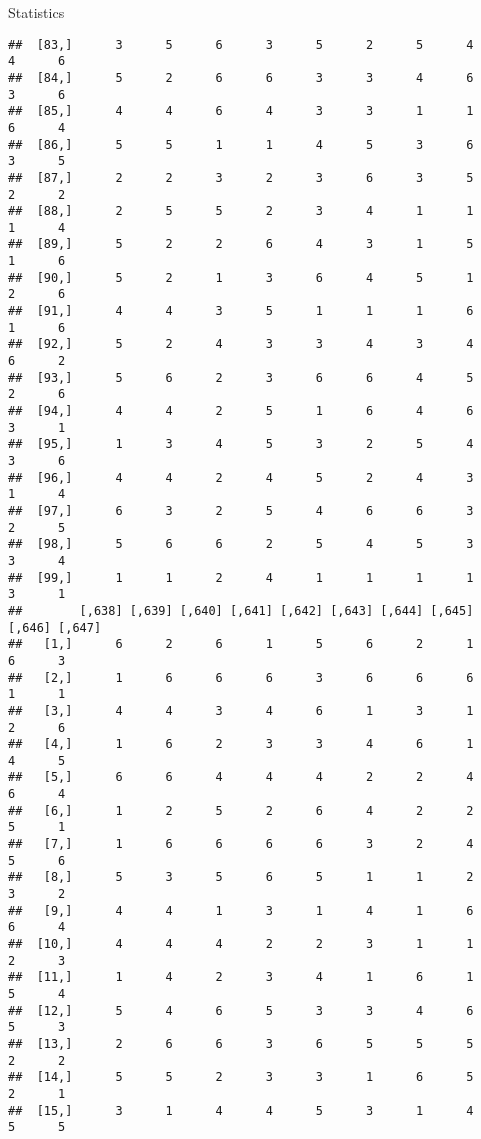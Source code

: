\documentclass[
  ignorenonframetext,
]{beamer}
\begin{document}
\begin{frame}[fragile]{Statistics}
\begin{verbatim}
##  [83,]      3      5      6      3      5      2      5      4      4      6
##  [84,]      5      2      6      6      3      3      4      6      3      6
##  [85,]      4      4      6      4      3      3      1      1      6      4
##  [86,]      5      5      1      1      4      5      3      6      3      5
##  [87,]      2      2      3      2      3      6      3      5      2      2
##  [88,]      2      5      5      2      3      4      1      1      1      4
##  [89,]      5      2      2      6      4      3      1      5      1      6
##  [90,]      5      2      1      3      6      4      5      1      2      6
##  [91,]      4      4      3      5      1      1      1      6      1      6
##  [92,]      5      2      4      3      3      4      3      4      6      2
##  [93,]      5      6      2      3      6      6      4      5      2      6
##  [94,]      4      4      2      5      1      6      4      6      3      1
##  [95,]      1      3      4      5      3      2      5      4      3      6
##  [96,]      4      4      2      4      5      2      4      3      1      4
##  [97,]      6      3      2      5      4      6      6      3      2      5
##  [98,]      5      6      6      2      5      4      5      3      3      4
##  [99,]      1      1      2      4      1      1      1      1      3      1
##        [,638] [,639] [,640] [,641] [,642] [,643] [,644] [,645] [,646] [,647]
##   [1,]      6      2      6      1      5      6      2      1      6      3
##   [2,]      1      6      6      6      3      6      6      6      1      1
##   [3,]      4      4      3      4      6      1      3      1      2      6
##   [4,]      1      6      2      3      3      4      6      1      4      5
##   [5,]      6      6      4      4      4      2      2      4      6      4
##   [6,]      1      2      5      2      6      4      2      2      5      1
##   [7,]      1      6      6      6      6      3      2      4      5      6
##   [8,]      5      3      5      6      5      1      1      2      3      2
##   [9,]      4      4      1      3      1      4      1      6      6      4
##  [10,]      4      4      4      2      2      3      1      1      2      3
##  [11,]      1      4      2      3      4      1      6      1      5      4
##  [12,]      5      4      6      5      3      3      4      6      5      3
##  [13,]      2      6      6      3      6      5      5      5      2      2
##  [14,]      5      5      2      3      3      1      6      5      2      1
##  [15,]      3      1      4      4      5      3      1      4      5      5

\end{verbatim}
\end{frame}
\end{document}
